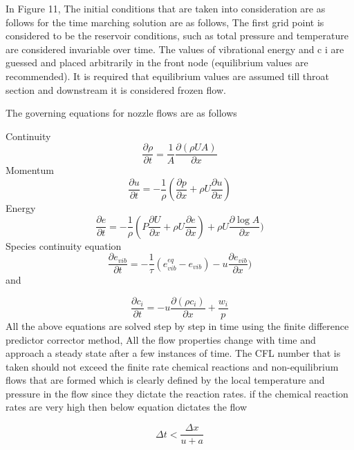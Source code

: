 In Figure 11, The initial conditions that are taken into consideration are as follows for the time marching solution are as follows, The first grid point is considered to be the reservoir conditions, such as total pressure and temperature are considered invariable over time. The values of vibrational energy and c i are guessed and placed arbitrarily in the front node (equilibrium values are recommended). It is required that equilibrium values are assumed till throat section and downstream it is considered frozen flow.

The governing equations for nozzle flows are as follows 

Continuity
\large\[\frac{\partial \rho}{\partial t} = \frac{1}{A} \frac{\partial({\rho U A})}{\partial x}\]
Momentum
\large \[\frac{\partial u}{\partial t} = -\frac{1}{\rho}(\frac{\partial p}{\partial x}+\rho U \frac{\partial u}{\partial x})\]
Energy
\large \[\frac{\partial e}{\partial t} = -\frac{1}{\rho}(P \frac{\partial U}{\partial x}+\rho U \frac{\partial e}{\partial x})+\rho U \frac{\partial \log A}{\partial x})\]
Species continuity equation 
\large \[\frac{\partial e_{vib}}{\partial t} = -\frac{1}{\tau}(e_{vib}^{eq}- e_{vib})- u\frac{\partial e_{vib}}{\partial x})\]
and

\large\[\frac{\partial c_i}{\partial t} = - u \frac{\partial({\rho c_i})}{\partial x}+\frac{w_i}{p}\]
All the above equations are solved step by step in time using the finite difference predictor corrector method, All the flow properties change with time and approach a steady state after a few instances of time. The CFL number that is taken should not exceed the finite rate chemical reactions and non-equilibrium flows that are formed which is clearly defined by the local temperature and pressure in the flow since they dictate the reaction rates. if the chemical reaction rates are very high then below equation dictates the flow

\[\Delta t < \frac{\Delta x}{u+a}\] 